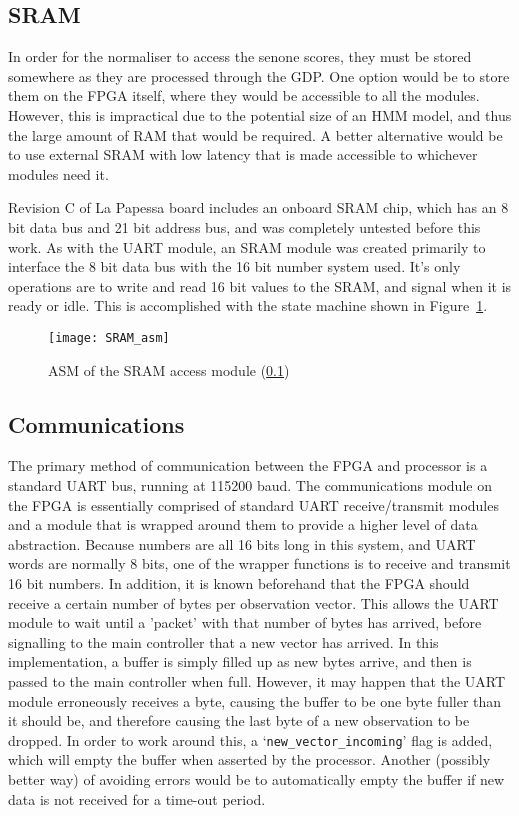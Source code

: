 	\subsection{SRAM} %
	\label{sub:onboard_sram}
		In order for the normaliser to access the senone scores, they must be stored somewhere as they are processed through the GDP.  One option would be to store them on the FPGA itself, where they would be accessible to all the modules.  However, this is impractical due to the potential size of an HMM model, and thus the large amount of RAM that would be required.  A better alternative would be to use external SRAM with low latency that is made accessible to whichever modules need it.

		Revision C of La Papessa board includes an onboard SRAM chip, which has an 8 bit data bus and 21 bit address bus, and was completely untested before this work.  As with the UART module, an SRAM module was created primarily to interface the 8 bit data bus with the 16 bit number system used.  It's only operations are to write and read 16 bit values to the SRAM, and signal when it is ready or idle.  This is accomplished with the state machine shown in Figure~\ref{fig:sram_asm}.

		\begin{figure}[tb]
			\begin{center}
				\texttt{[image: SRAM\_asm]}
			\end{center}
			\caption{ASM of the SRAM access module (\ref{sub:onboard_sram})}
			\label{fig:sram_asm}
		\end{figure}

	\subsection{Communications} %
	\label{sub:fpga_communications}
		The primary method of communication between the FPGA and processor is a standard UART bus, running at 115200 baud.  The communications module on the FPGA is essentially comprised of standard UART receive/transmit modules and a module that is wrapped around them to provide a higher level of data abstraction.  Because numbers are all 16 bits long in this system, and UART words are normally 8 bits, one of the wrapper functions is to receive and transmit 16 bit numbers.  In addition, it is known beforehand that the FPGA should receive a certain number of bytes per observation vector.  This allows the UART module to wait until a 'packet' with that number of bytes has arrived, before signalling to the main controller that a new vector has arrived.  In this implementation, a buffer is simply filled up as new bytes arrive, and then is passed to the main controller when full.  However, it may happen that the UART module erroneously receives a byte, causing the buffer to be one byte fuller than it should be, and therefore causing the last byte of a new observation to be dropped.  In order to work around this, a `\texttt{new\_vector\_incoming}' flag is added, which will empty the buffer when asserted by the processor.  Another (possibly better way) of avoiding errors would be to automatically empty the buffer if new data is not received for a time-out period.

